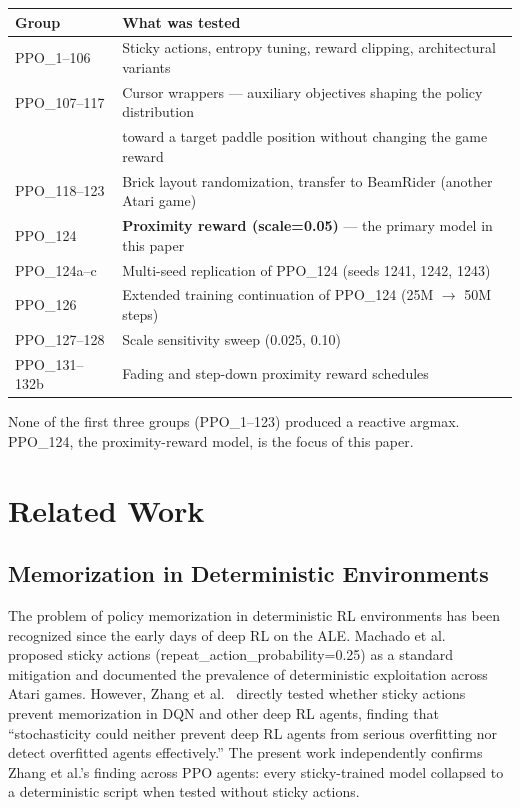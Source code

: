 \documentclass[11pt]{article}
\begin{document}
\vspace{4pt}
\begin{tabular}{ll}
\toprule
\textbf{Group} & \textbf{What was tested} \\
\midrule
PPO\_1--106   & Sticky actions, entropy tuning, reward clipping, architectural variants \\
PPO\_107--117 & Cursor wrappers --- auxiliary objectives shaping the policy distribution \\
              & toward a target paddle position without changing the game reward \\
PPO\_118--123 & Brick layout randomization, transfer to BeamRider (another Atari game) \\
PPO\_124      & \textbf{Proximity reward (scale=0.05)} --- the primary model in this paper \\
PPO\_124a--c  & Multi-seed replication of PPO\_124 (seeds 1241, 1242, 1243) \\
PPO\_126      & Extended training continuation of PPO\_124 (25M $\to$ 50M steps) \\
PPO\_127--128 & Scale sensitivity sweep (0.025, 0.10) \\
PPO\_131--132b& Fading and step-down proximity reward schedules \\
\bottomrule
\end{tabular}

\vspace{8pt}
\noindent None of the first three groups (PPO\_1--123) produced a reactive
argmax. PPO\_124, the proximity-reward model, is the focus of this paper.

\section{Related Work}

\subsection{Memorization in Deterministic Environments}

The problem of policy memorization in deterministic RL environments has been
recognized since the early days of deep RL on the ALE. Machado et
al.~\cite{machado2018revisiting} proposed sticky actions
(repeat\_action\_probability=0.25) as a standard mitigation and documented the
prevalence of deterministic exploitation across Atari games. However, Zhang et
al.~\cite{zhang2018overfitting} directly tested whether sticky actions prevent
memorization in DQN and other deep RL agents, finding that ``stochasticity could
neither prevent deep RL agents from serious overfitting nor detect overfitted
agents effectively.'' The present work independently confirms Zhang et al.'s
finding across PPO agents: every sticky-trained model collapsed to a
deterministic script when tested without sticky actions.
\end{document}
